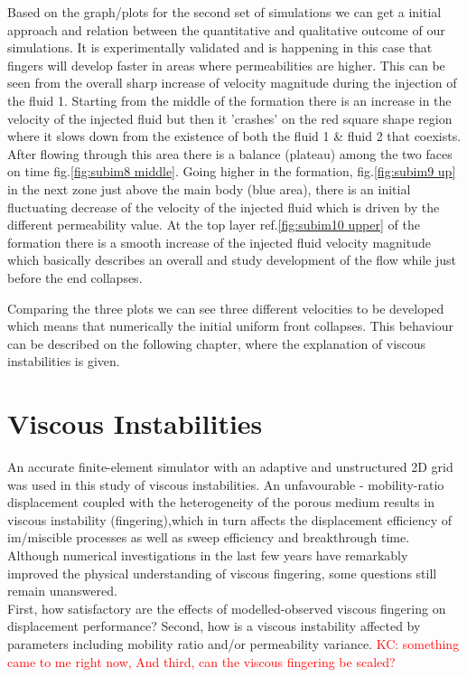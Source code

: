 \documentclass[preprint,authoryear,12pt]{elsarticle}
\begin{document}
Based on the graph/plots for the second set of simulations we can get a initial approach and relation between the quantitative and qualitative outcome of our simulations. It is experimentally validated and is happening in this case that fingers will develop faster in areas where permeabilities are higher. This can be seen from the overall sharp increase of velocity magnitude during the injection of the fluid 1. Starting from the middle of the formation there is an increase in the velocity of the injected fluid but then it 'crashes' on the red square shape region where it slows down from the existence of both the fluid 1 \& fluid 2 that coexists. After flowing through this area there is a balance (plateau) among the two faces on time fig.\ref{fig:subim8 middle}. Going higher in the formation, fig.\ref{fig:subim9 up} in the next zone just above the main body (blue area), there is an initial fluctuating decrease  of the velocity of the injected fluid which is driven by the different permeability value. At the top layer ref.\ref{fig:subim10 upper} of the formation there is a smooth increase of the injected fluid velocity magnitude which basically describes an overall and study development of the flow while just before the end collapses. 

Comparing the three plots we can see three different velocities to be developed which means that numerically the initial uniform front collapses. This behaviour can be described on the following chapter, where the explanation of viscous instabilities is given.         
  

\section{Viscous Instabilities}\label{section:ViscousInstabilities}

An accurate finite-element simulator with an adaptive and unstructured 2D grid was used in this study of viscous 
instabilities. An unfavourable - mobility-ratio displacement coupled with the heterogeneity of the porous medium results in viscous instability (fingering),which in turn affects the displacement efficiency of im/miscible processes as well as sweep efficiency and breakthrough time. Although numerical investigations 
in the last few years have remarkably improved the physical 
understanding of viscous fingering, some questions still remain 
unanswered.\\
 
First, how satisfactory are the effects of modelled-observed viscous fingering on displacement performance? Second, how 
is a viscous instability affected by parameters including mobility 
ratio and/or permeability variance. \textcolor{red}{ KC: something came to me right now, And third, can the viscous fingering be scaled?}  
\end{document}
